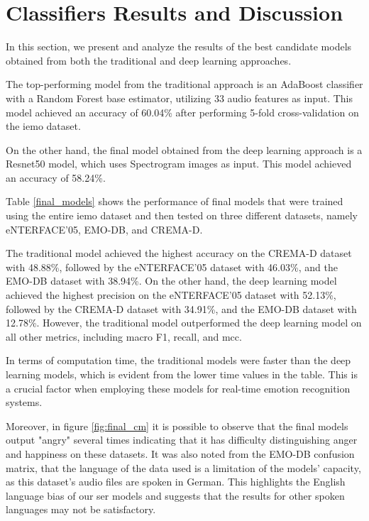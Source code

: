 \section{Classifiers Results and Discussion}

In this section, we present and analyze the results of the best candidate models obtained from both the traditional and deep learning approaches.

The top-performing model from the traditional approach is an AdaBoost classifier with a Random Forest base estimator, utilizing 33 audio features as input. This model achieved an accuracy of 60.04\% after performing 5-fold cross-validation on the \ac{iemo} dataset.

On the other hand, the final model obtained from the deep learning approach is a Resnet50 model, which uses Spectrogram images as input. This model achieved an accuracy of 58.24\%.

Table \ref{final_models} shows the performance of final models that were trained using the entire \ac{iemo} dataset and then tested on three different datasets, namely eNTERFACE'05, EMO-DB, and CREMA-D.

The traditional model achieved the highest accuracy on the CREMA-D dataset with 48.88\%, followed by the eNTERFACE'05 dataset with 46.03\%, and the EMO-DB dataset with 38.94\%. On the other hand, the deep learning model achieved the highest precision on the eNTERFACE'05 dataset with 52.13\%, followed by the CREMA-D dataset with 34.91\%, and the EMO-DB dataset with 12.78\%. However, the traditional model outperformed the deep learning model on all other metrics, including macro F1, recall, and \ac{mcc}.

In terms of computation time, the traditional models were faster than the deep learning models, which is evident from the lower time values in the table. This is a crucial factor when employing these models for real-time emotion recognition systems.

Moreover, in figure \ref{fig:final_cm} it is possible to observe that the final models output "angry" several times indicating that it has difficulty distinguishing anger and happiness on these datasets. It was also noted from the EMO-DB confusion matrix, that the language of the data used is a limitation of the models' capacity, as this dataset's audio files are spoken in German. This highlights the English language bias of our \ac{ser} models and suggests that the results for other spoken languages may not be satisfactory.

